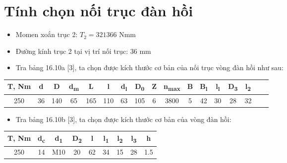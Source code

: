 \section{Tính chọn nối trục đàn hồi}
\begin{itemize}
    \item Momen xoắn trục 2: $T_2 = 321366$ Nmm
    \item Đường kính trục 2 tại vị trí nối trục: 36 mm
    \item Tra bảng 16.10a [3], ta chọn được kích thước cơ bản của nối trục vòng đàn hồi như sau:
\end{itemize}
\begin{table}[H]
    \centering
    \begin{tabular}{|c|c|c|c|c|c|c|c|c|c|c|c|c|c|c|c|c|}
    \hline
    \textbf{T, Nm} & \textbf{d} & \textbf{D} & \textbf{d\textsubscript{m}} & \textbf{L} & \textbf{l} & \textbf{d\textsubscript{l}} & \textbf{D\textsubscript{0}} & \textbf{Z} & \textbf{n\textsubscript{max}} & \textbf{B} & \textbf{B\textsubscript{l}} & \textbf{l\textsubscript{l}} & \textbf{D\textsubscript{3}} & \textbf{l\textsubscript{2}} \\
    \hline
    250 & 36 & 140 & 65 & 165 & 110 & 63 & 105 & 6 & 3800 & 5 & 42 & 30 & 28 & 32 \\
    \hline
    \end{tabular}
\end{table}
\begin{itemize}
    \item Tra bảng 16.10b [3], ta chọn được kích thước cơ bản của vòng đàn hồi:
\end{itemize}
\begin{table}[h]
    \centering
    \begin{tabular}{|c|c|c|c|c|c|c|c|c|}
    \hline
    \textbf{T, Nm} & \textbf{d\textsubscript{c}} & \textbf{d\textsubscript{1}} & \textbf{D\textsubscript{2}} & \textbf{l} & \textbf{l\textsubscript{1}} & \textbf{l\textsubscript{2}} & \textbf{l\textsubscript{3}} & \textbf{h} \\
    \hline
    250 & 14 & M10 & 20 & 62 & 34 & 15 & 28 & 1.5 \\
    \hline
    \end{tabular}
\end{table}

